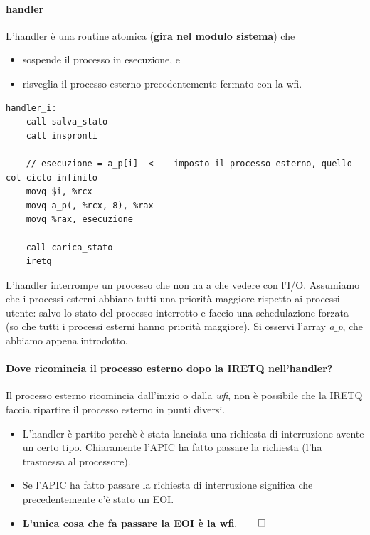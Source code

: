 \documentclass[11pt]{report}
\theoremstyle{definition}
\begin{document}
\paragraph{handler} L'handler è una routine atomica (\textbf{gira nel modulo sistema}) che 
\begin{itemize}
	\item sospende il processo in esecuzione, e
	\item risveglia il processo esterno precedentemente fermato con la wfi.
\end{itemize} 
\begin{verbatim}
handler_i:
    call salva_stato
    call inspronti
	
    // esecuzione = a_p[i]  <--- imposto il processo esterno, quello col ciclo infinito
    movq $i, %rcx 
    movq a_p(, %rcx, 8), %rax
    movq %rax, esecuzione
    
    call carica_stato
    iretq
\end{verbatim} L'handler interrompe un processo che non ha a che vedere con l'I/O. Assumiamo che i processi esterni abbiano tutti una priorità maggiore rispetto ai processi utente: salvo lo stato del processo interrotto e faccio una schedulazione forzata (so che tutti i processi esterni hanno priorità maggiore). Si osservi l'array \emph{a$\_$p}, che abbiamo appena introdotto.

\paragraph{Dove ricomincia il processo esterno dopo la IRETQ nell'handler?} 
Il processo esterno ricomincia dall'inizio o dalla \textit{wfi}, non è possibile che la IRETQ faccia ripartire il processo esterno in punti diversi.
\begin{itemize}
	\item L'handler è partito perchè è stata lanciata una richiesta di interruzione avente un certo tipo. Chiaramente l'APIC ha fatto passare la richiesta (l'ha trasmessa al processore).
	\item Se l'APIC ha fatto passare la richiesta di interruzione significa che precedentemente c'è stato un EOI. 
	\item \textbf{L'unica cosa che fa passare la EOI è la wfi}.$\qed$
\end{itemize}
\end{document}
